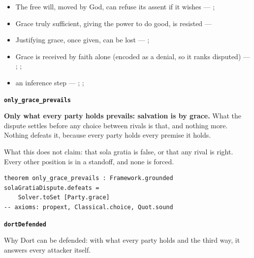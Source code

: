 \documentclass[11pt]{article}
\begin{document}
\begin{itemize}
\begin{itemize}
\item The free will, moved by God, can refuse its assent if it wishes --- \cite[Trent, Session VI (1547), canon 4]{tanner-decrees-1990}; \cite[45]{waterworth-trent-1848}
\item Grace truly sufficient, giving the power to do good, is resisted --- \cite[ch. VI]{garrigou-lagrange-grace-1952}
\item Justifying grace, once given, can be lost --- \cite[II-II q.24 a.11]{aquinas-summa-1920}; \cite[Trent, Session VI (1547), canon 23]{tanner-decrees-1990}
\item Grace is received by faith alone (encoded as a denial, so it ranks disputed) --- \cite[II-II q.4 a.3]{aquinas-summa-1920}; \cite[I-II q.113 a.4 ad 1]{aquinas-summa-1920}; \cite[Trent, Session VI (1547), canon 9]{tanner-decrees-1990}
\item an inference step --- \cite{pohle-molinism-1911}; \cite[I-II q.112 a.3]{aquinas-summa-1920}; \cite[ch. VII]{garrigou-lagrange-grace-1952}
\end{itemize}
\end{itemize}
\par\medskip\noindent\textbf{\texttt{only\_\allowbreak{}grace\_\allowbreak{}prevails}}\par\nobreak\noindent
\textbf{Only what every party holds prevails: salvation is by grace.} What the dispute settles before any choice between rivals is that, and nothing more. Nothing defeats it, because every party holds every premise it holds.

What this does not claim: that sola gratia is false, or that any rival is right. Every other position is in a standoff, and none is forced.

{\small\begin{verbatim}
theorem only_grace_prevails : Framework.grounded solaGratiaDispute.defeats =
    Solver.toSet [Party.grace]
-- axioms: propext, Classical.choice, Quot.sound
\end{verbatim}}
\par\medskip\noindent\textbf{\texttt{dort\allowbreak{}Defended}}\par\nobreak\noindent
Why Dort can be defended: with what every party holds and the third way, it answers every attacker itself.
\end{document}
